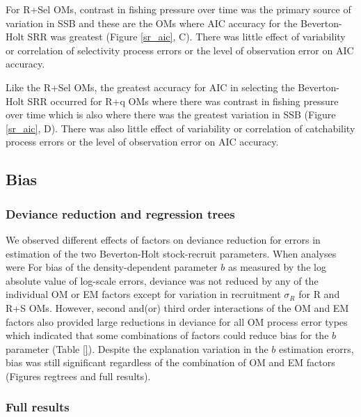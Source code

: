\documentclass[
  12pt,
]{article}
\begin{document}
For R+Sel OMs, contrast in fishing pressure over time was the primary
source of variation in SSB and these are the OMs where AIC accuracy for
the Beverton-Holt SRR was greatest (Figure \ref{sr_aic}, C). There was
little effect of variability or correlation of selectivity process
errors or the level of observation error on AIC accuracy.

Like the R+Sel OMs, the greatest accuracy for AIC in selecting the
Beverton-Holt SRR occurred for R+q OMs where there was contrast in
fishing pressure over time which is also where there was the greatest
variation in SSB (Figure \ref{sr_aic}, D). There was also little effect
of variability or correlation of catchability process errors or the
level of observation error on AIC accuracy.

\hypertarget{bias-1}{%
\subsection*{Bias}\label{bias-1}}

\hypertarget{deviance-reduction-and-regression-trees}{%
\subsubsection*{Deviance reduction and regression
trees}\label{deviance-reduction-and-regression-trees}}

We observed different effects of factors on deviance reduction for
errors in estimation of the two Beverton-Holt stock-recruit parameters.
When analyses were For bias of the density-dependent parameter \(b\) as
measured by the log absolute value of log-scale errors, deviance was not
reduced by any of the individual OM or EM factors except for variation
in recruitment \(\sigma_R\) for R and R+S OMs. However, second and(or)
third order interactions of the OM and EM factors also provided large
reductions in deviance for all OM process error types which indicated
that some combinations of factors could reduce bias for the \(b\)
parameter (Table \ref{}). Despite the explanation variation in the \(b\)
estimation erorrs, bias was still significant regardless of the
combination of OM and EM factors (Figures regtrees and full results).

\hypertarget{full-results-3}{%
\subsubsection*{Full results}\label{full-results-3}}
\end{document}
